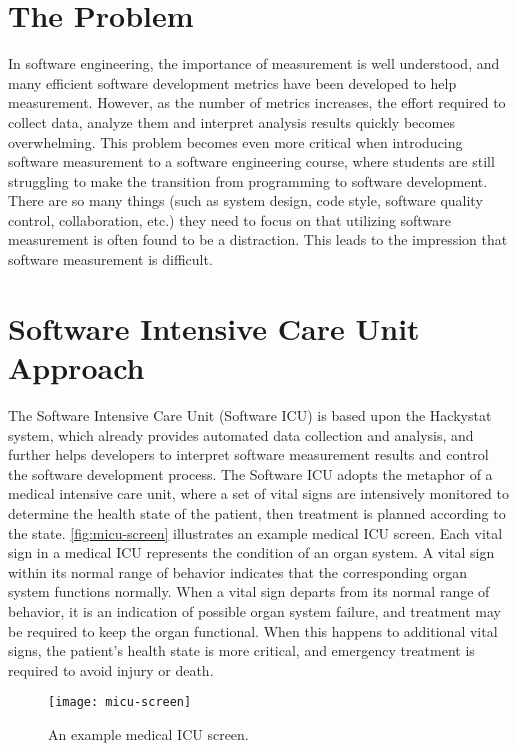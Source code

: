 \section{The Problem}
In software engineering, the importance of measurement is well understood, and many efficient software development metrics have been developed to help measurement. However, as the number of metrics increases, the effort required to collect data, analyze them and interpret analysis results quickly becomes overwhelming. This problem becomes even more critical when introducing software measurement to a software engineering course, where students are still struggling to make the transition from programming to software development. There are so many things (such as system design, code style, software quality control, collaboration, etc.) they need to focus on that utilizing software measurement is often found to be a distraction. This leads to the impression that software measurement is difficult. 

\section{Software Intensive Care Unit Approach}
The Software Intensive Care Unit (Software ICU) is based upon the Hackystat system, which already provides automated data collection and analysis, and further helps developers to interpret software measurement results and control the software development process. The Software ICU adopts the metaphor of a medical intensive care unit, where a set of vital signs are intensively monitored to determine the health state of the patient, then treatment is planned according to the state. \autoref{fig:micu-screen} illustrates an example medical ICU screen. Each vital sign in a medical ICU represents the condition of an organ system. A vital sign within its normal range of behavior indicates that the corresponding organ system functions normally. When a vital sign departs from its normal range of behavior, it is an indication of possible organ system failure, and treatment may be required to keep the organ functional. When this happens to additional vital signs, the patient's health state is more critical, and emergency treatment is required to avoid injury or death.

\begin{figure}[htbp]
   \centering
   \texttt{[image: micu-screen]}
   \caption{An example medical ICU screen.}
   \label{fig:micu-screen}
\end{figure}

